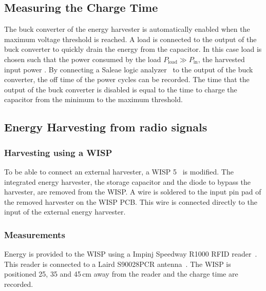 

\subsection{Measuring the Charge Time}

The buck converter of the energy harvester is automatically enabled when the maximum voltage threshold is reached.
A load is connected to the output of the buck converter to quickly drain the energy from the capacitor.
In this case load is chosen such that the power consumed by the load $P_{\text{load}} \gg P_{\text{in}}$, the harvested input power .
By connecting a Saleae logic analyzer~\cite{saleae_2017} to the output of the buck converter, the off time of the power cycles can be recorded.
The time that the output of the buck converter is disabled is equal to the time to charge the capacitor from the minimum to the maximum threshold.

\subsection{Energy Harvesting from radio signals}

\subsubsection{Harvesting using a WISP}
To be able to connect an external harvester, a WISP 5~\cite{sample_transim_2008} is modified.
The integrated energy harvester, the storage capacitor and the diode to bypass the harvester, are removed from the WISP.
A wire is soldered to the input pin pad of the removed harvester on the WISP PCB.
This wire is connected directly to the input of the external energy harvester.

\subsubsection{Measurements}
Energy is provided to the WISP using a Impinj Speedway R1000 RFID reader~\cite{impinj_eol_2017, indy_r1000_2017}.
This reader is connected to a Laird S90028PCR antenna~\cite{laird_s9028pcr_2017}.
The WISP is positioned 25, 35 and 45\,cm away from the reader and the charge time are recorded.

